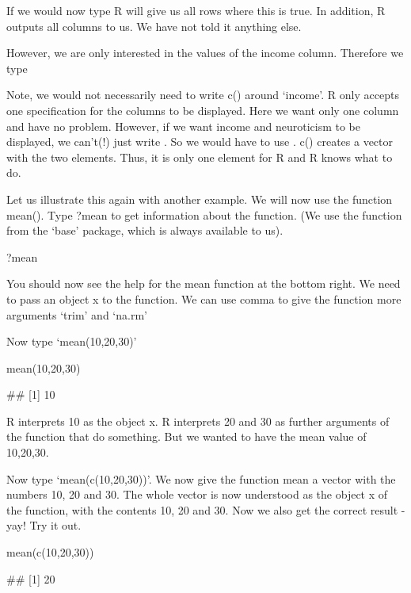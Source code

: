 If we would now type  R will give us all rows where this is true. In addition, R outputs all columns to us. We have not told it anything else.

However, we are only interested in the values of the income column. Therefore we type 

Note, we would not necessarily need to write c() around ‘income’. R only accepts one specification for the columns to be displayed. Here we want only one column and have no problem. However, if we want income and neuroticism to be displayed, we can’t(!) just write .
%
So we would have to use . c() creates a vector with the two elements. Thus, it is only one element for R and R knows what to do.

Let us illustrate this again with another example. We will now use the function mean(). Type ?mean to get information about the function. (We use the function from the ‘base’ package, which is always available to us).

\begin{rblock1}
	?mean
\end{rblock1}

You should now see the help for the mean function at the bottom right. We need to pass an object x to the function. We can use comma to give the function more arguments ‘trim’ and ‘na.rm’

Now type ‘mean(10,20,30)’

\begin{rblock1}
	mean(10,20,30)
	
	## [1] 10
\end{rblock1}

R interprets 10 as the object x. R interprets 20 and 30 as further arguments of the function that do something. But we wanted to have the mean value of 10,20,30.

Now type ‘mean(c(10,20,30))’. We now give the function mean a vector with the numbers 10, 20 and 30. The whole vector is now understood as the object x of the function, with the contents 10, 20 and 30. Now we also get the correct result - yay! Try it out.

\begin{rblock1}
	mean(c(10,20,30))
	
	## [1] 20
\end{rblock1}

